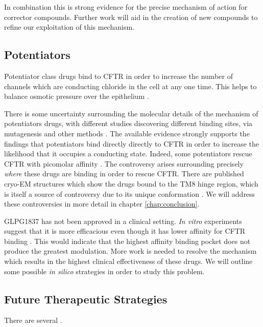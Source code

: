 In combination this is strong evidence for the precise mechanism of action for corrector compounds. Further work will aid in the creation of new compounds to refine our exploitation of this mechanism.

\subsection{Potentiators}
Potentiator class drugs bind to CFTR in order to increase the number of channels which are conducting chloride in the cell at any one time. This helps to balance osmotic pressure over the epithelium \cite{jih2013,yeh2017}. 

There is some uncertainty surrounding the molecular details of the mechanism of potentiators drugs, with different studies discovering different binding sites, via mutagenesis and other methods \cite{yeh2019, liu2019, laselva2021}. The available evidence strongly supports the findings that potentiators bind directly directly to CFTR in order to increase the likelihood that it occupies a conducting state. Indeed, some potentiators rescue CFTR with picomolar affinity \cite{csanady2019}. The controversy arises surrounding precisely \textit{where} these drugs are binding in order to rescue CFTR. There are published cryo-EM structures which show the drugs bound to the TM8 hinge region, which is itself a source of controversy due to its unique conformation \cite{liu2019}. We will address these controversies in more detail in chapter \ref{chap:conclusion}.  

GLPG1837 has not been approved in a clinical setting. \textit {In vitro} experiments suggest that it is more efficacious even though it has lower affinity for CFTR binding \cite{vanderplas2018}. This would indicate that the highest affinity binding pocket does not produce the greatest modulation. More work is needed to resolve the mechanism which results in the highest clinical effectiveness of these drugs. We will outline some possible \textit{in silico} strategies in order to study this problem. 

\subsection{Future Therapeutic Strategies}
There are several .

